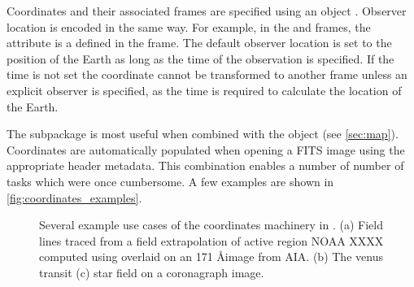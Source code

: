 Coordinates and their associated frames are specified using an \astropy {} object \citep[see Section 3.3 of][]{astropy2018}.
Observer location is encoded in the same way.
For example, in the \hpc and \hcc frames, the  attribute is a  defined in the \hgs frame.
The default observer location is set to the position of the Earth as long as the time of the observation is specified.
If the time is not set the coordinate cannot be transformed to another frame unless an explicit observer is specified, as the time is required to calculate the location of the Earth.

The  subpackage is most useful when combined with the  object (see \autoref{sec:map}).
Coordinates are automatically populated when opening a FITS image using the appropriate header metadata.
This combination enables a number of number of tasks which were once cumbersome.
A few examples are shown in \autoref{fig:coordinates_examples}.


\begin{figure}
    \caption{Several example use cases of the coordinates machinery in \sunpy.
    (a) Field lines traced from a field extrapolation of active region NOAA XXXX computed using  overlaid on an 171 \AA image from AIA. (b) The venus transit (c) star field on a coronagraph image.}
    \label{fig:coordinates_examples}
\end{figure}





